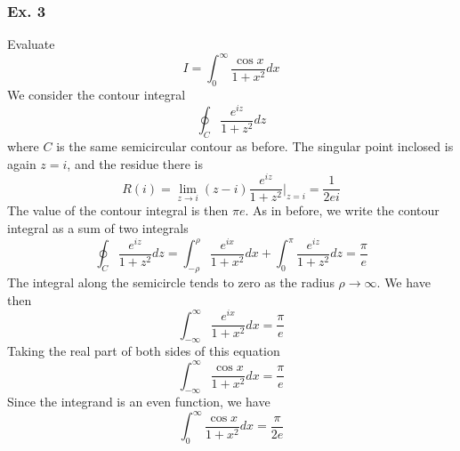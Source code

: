 \documentclass[../main.tex]{subfiles}
\begin{document}
\subsubsection*{Ex. 3} Evaluate \begin{equation*}
    I =\int_{0}^{\infty}\frac{\cos x}{1+x^2}dx
\end{equation*}
We consider the contour integral
\begin{equation*}
    \oint_C\frac{e^{iz}}{1+z^2}dz
\end{equation*}
where $C$ is the same semicircular contour as before. The singular point inclosed is again $z = i$, and the residue there is
\begin{equation*}
    R(i)=\lim_{z\rightarrow i}(z-i)\frac{e^{iz}}{1+z^2}\bigg|_{z=i}=\frac{1}{2ei}
\end{equation*}
The value of the contour integral is then $\pi e$. As in before, we write the contour integral as a sum of two integrals
\begin{equation*}
    \oint_C\frac{e^{iz}}{1+z^2}dz=\int_{-\rho}^{\rho}\frac{e^{ix}}{1+x^2}dx+\int_{0}^{\pi}\frac{e^{iz}}{1+ z^2}dz=\frac{\pi}{e}
\end{equation*}
The integral along the semicircle tends to zero as the radius $\rho\rightarrow\infty$. We have then
\begin{equation*}
    \int_{-\infty}^{\infty}\frac{e^{ix}}{1+x^2}dx=\frac{\pi}{e}
\end{equation*}
Taking the real part of both sides of this equation
\begin{equation*}
    \int_{-\infty}^{\infty}\frac{\cos x}{1+x^2}dx=\frac{\pi}{e}
\end{equation*} 
Since the integrand is an even function, we have 
\begin{equation*}
    \int_{0}^{\infty}\frac{\cos x}{1+x^2}dx=\frac{\pi}{2e}
\end{equation*}
\end{document}

